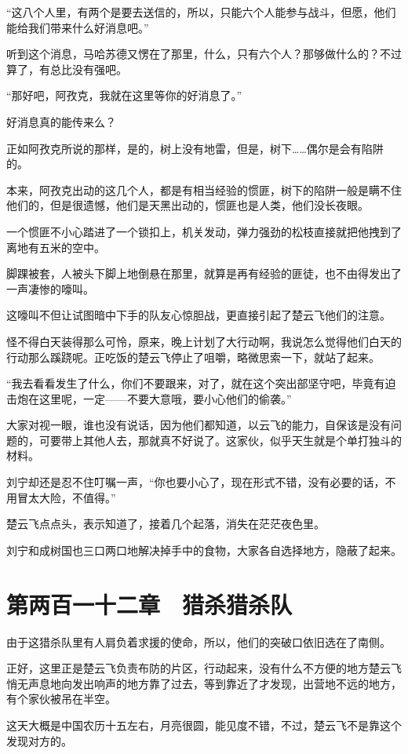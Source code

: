 “这八个人里，有两个是要去送信的，所以，只能六个人能参与战斗，但愿，他们能给我们带来什么好消息吧。”

听到这个消息，马哈苏德又愣在了那里，什么，只有六个人？那够做什么的？不过算了，有总比没有强吧。

“那好吧，阿孜克，我就在这里等你的好消息了。”

好消息真的能传来么？

正如阿孜克所说的那样，是的，树上没有地雷，但是，树下……偶尔是会有陷阱的。

本来，阿孜克出动的这几个人，都是有相当经验的惯匪，树下的陷阱一般是瞒不住他们的，但是很遗憾，他们是天黑出动的，惯匪也是人类，他们没长夜眼。

一个惯匪不小心踏进了一个锁扣上，机关发动，弹力强劲的松枝直接就把他拽到了离地有五米的空中。

脚踝被套，人被头下脚上地倒悬在那里，就算是再有经验的匪徒，也不由得发出了一声凄惨的嚎叫。

这嚎叫不但让试图暗中下手的队友心惊胆战，更直接引起了楚云飞他们的注意。

怪不得白天装得那么可怜，原来，晚上计划了大行动啊，我说怎么觉得他们白天的行动那么蹊跷呢。正吃饭的楚云飞停止了咀嚼，略微思索一下，就站了起来。

“我去看看发生了什么，你们不要跟来，对了，就在这个突出部坚守吧，毕竟有迫击炮在这里呢，一定——不要大意哦，要小心他们的偷袭。”

大家对视一眼，谁也没有说话，因为他们都知道，以云飞的能力，自保该是没有问题的，可要带上其他人去，那就真不好说了。这家伙，似乎天生就是个单打独斗的材料。

刘宁却还是忍不住叮嘱一声，“你也要小心了，现在形式不错，没有必要的话，不用冒太大险，不值得。”

楚云飞点点头，表示知道了，接着几个起落，消失在茫茫夜色里。

刘宁和成树国也三口两口地解决掉手中的食物，大家各自选择地方，隐蔽了起来。

\section{第两百一十二章　猎杀猎杀队}

由于这猎杀队里有人肩负着求援的使命，所以，他们的突破口依旧选在了南侧。

正好，这里正是楚云飞负责布防的片区，行动起来，没有什么不方便的地方楚云飞悄无声息地向发出响声的地方靠了过去，等到靠近了才发现，出营地不远的地方，有个家伙被吊在半空。

这天大概是中国农历十五左右，月亮很圆，能见度不错，不过，楚云飞不是靠这个发现对方的。

